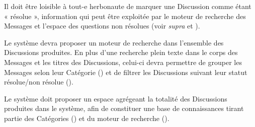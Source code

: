 Il doit être loisible à tout-e herbonaute de marquer une Discussion comme étant « résolue », information qui peut être exploitée par le moteur de recherche des Messages et l'espace des questions non résolues (voir {\em supra}  et ).

\startsection[title={Moteur de recherche des Messages},reference=disc:recherche]

Le système devra proposer un moteur de recherche dans l'ensemble des Discussions produites.
En plus d'une recherche plein texte dans le corps des Messages et les titres des Discussions, celui-ci devra permettre de grouper les Messages selon leur Catégorie () et de filtrer les Discussions suivant leur statut résolue/non résolue ().

\startsection[title={L'espace des Discussion}]

Le système doit proposer un espace agrégeant la totalité des Discussions produites dans le système, afin de constituer une base de connaissances tirant partie des Catégories () et du moteur de recherche ().